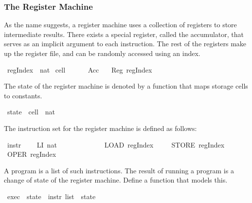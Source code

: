 \begin{isabellebody}
\begin{isamarkuptext}
\subsubsection*{The Register Machine}%
\end{isamarkuptext}%
\isamarkuptrue%
%
\begin{isamarkuptext}%
As the name suggests, a register machine uses a collection of registers to store intermediate results. There exists a special register, called the accumulator, that serves as an implicit argument to each instruction. The rest of the registers make up the register file, and can be randomly accessed using an index.%
\end{isamarkuptext}%
\isamarkuptrue%
\ regIndex\ {\isacharequal}\ nat\isanewline
\isanewline
\isamarkupfalse%
\ cell\ {\isacharequal}\ \isanewline
\ \ \ \ Acc\isanewline
\ \ {\isacharbar}\ Reg\ regIndex\isamarkupfalse%
%
\begin{isamarkuptext}%
The state of the register machine is denoted by a function that maps storage cells to constants.%
\end{isamarkuptext}%
\isamarkuptrue%
\ state\ {\isacharequal}\ {\isachardoublequote}cell\ {\isasymRightarrow}\ nat{\isachardoublequote}\isamarkupfalse%
%
\begin{isamarkuptext}%
The instruction set for the register machine is defined as follows:%
\end{isamarkuptext}%
\isamarkuptrue%
\ instr\ {\isacharequal}\ \isanewline
\ \ LI\ nat\ \ \ \ \ \ \ \ \isanewline
\ \ %
\ \isanewline
{\isacharbar}\ LOAD\ regIndex\ \isanewline
\ \ %
\isanewline
{\isacharbar}\ STORE\ regIndex\ \isanewline
\ \ %
\ \isanewline
{\isacharbar}\ OPER\ regIndex\ \isanewline
\ \ %
\isanewline
\ \ \ \ %
\isanewline
\ \ \ \ %
\ \isanewline
\ \ \ \ %
\isamarkupfalse%
%
\begin{isamarkuptext}%
A program is a list of such instructions. The result of running a program is a change of state of the register machine. Define a function  that models this.%
\end{isamarkuptext}%
\isamarkuptrue%
\ exec\ {\isacharcolon}{\isacharcolon}\ {\isachardoublequote}state\ {\isasymRightarrow}\ instr\ list\ {\isasymRightarrow}\ state{\isachardoublequote}\isamarkupfalse%
%
\begin{isamarkuptext}%

\end{isamarkuptext}
\end{isabellebody}
